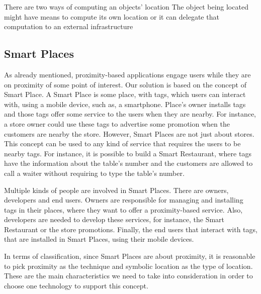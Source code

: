 There are two ways of computing an objects' location
The object being located might have means to compute its own location or it can delegate that computation to an external infrastructure

\subsection{Smart Places}
\label{sec:background_smart_places}
As already mentioned, proximity-based applications engage users while they are on proximity of some point of interest.
Our solution is based on the concept of Smart Place.
A Smart Place is some place, with tags, which users can interact with, using a mobile device, such as, a smartphone.
Place's owner installs tags and those tags offer some service to the users when they are nearby.
For instance, a store owner could use these tags to advertise some promotion when the customers are nearby the store.
However, Smart Places are not just about stores.
This concept can be used to any kind of service that requires the users to be nearby tags.
For instance, it is possible to build a Smart Restaurant, where tags have the information about the table's number and the customers are allowed to call a waiter without requiring to type the table's number.

Multiple kinds of people are involved in Smart Places.
There are owners, developers and end users.
Owners are responsible for managing and installing tags in their places, where they want to offer a proximity-based service.
Also, developers are needed to develop these services, for instance, the Smart Restaurant or the store promotions.
Finally, the end users that interact with tags, that are installed in Smart Places, using their mobile devices.

In terms of classification, since Smart Places are about proximity, it is reasonable to pick proximity as the technique and symbolic location as the type of location.
These are the main characteristics we need to take into consideration in order to choose one technology to support this concept.

